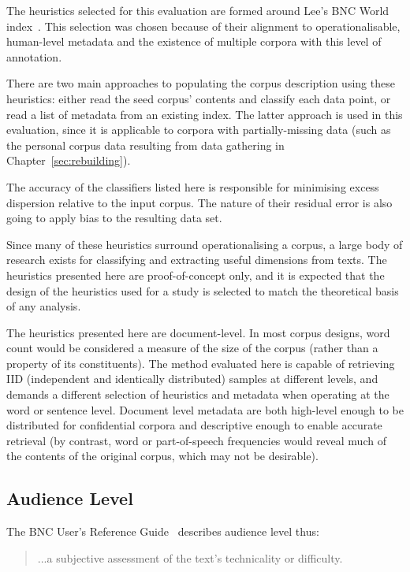 The heuristics selected for this evaluation are formed around Lee's BNC World index~\cite{lee2003bnc}.  This selection was chosen because of their alignment to operationalisable, human-level metadata and the existence of multiple corpora with this level of annotation.



There are two main approaches to populating the corpus description using these heuristics: either read the seed corpus' contents and classify each data point, or read a list of metadata from an existing index.  The latter approach is used in this evaluation, since it is applicable to corpora with partially-missing data (such as the personal corpus data resulting from data gathering in Chapter~\ref{sec:rebuilding}).

The accuracy of the classifiers listed here is responsible for minimising excess dispersion relative to the input corpus.  The nature of their residual error is also going to apply bias to the resulting data set.

Since many of these heuristics surround operationalising a corpus, a large body of research exists for classifying and extracting useful dimensions from texts.  The heuristics presented here are proof-of-concept only, and it is expected that the design of the heuristics used for a study is selected to match the theoretical basis of any analysis.

The heuristics presented here are document-level.  In most corpus designs, word count would be considered a measure of the size of the corpus (rather than a property of its constituents).  The method evaluated here is capable of retrieving IID (independent and identically distributed) samples at different levels, and demands a different selection of heuristics and metadata when operating at the word or sentence level.  Document level metadata are both high-level enough to be distributed for confidential corpora and descriptive enough to enable accurate retrieval (by contrast, word or part-of-speech frequencies would reveal much of the contents of the original corpus, which may not be desirable).




\subsection{Audience Level}
The BNC User's Reference Guide~\cite{burnard1995users} describes audience level thus:

\begin{quote}
...a subjective assessment of the text's technicality or difficulty.
\end{quote}

